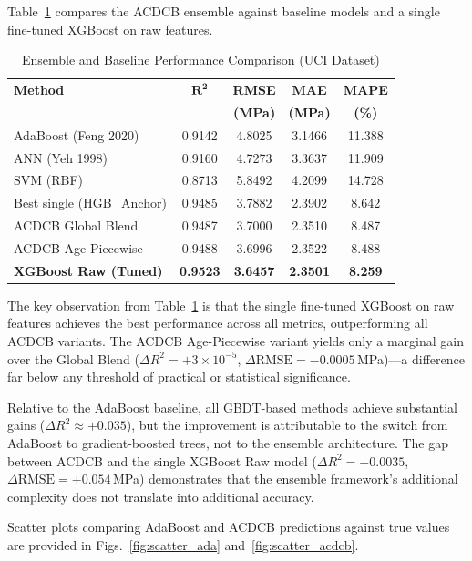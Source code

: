 \documentclass[journal]{IEEEtran}
\begin{document}
Table~\ref{tab:ensemble} compares the ACDCB ensemble against baseline models and a single fine-tuned XGBoost on raw features.

\begin{table}[!t]
\renewcommand{\arraystretch}{1.15}
\caption{Ensemble and Baseline Performance Comparison (UCI Dataset)}
\label{tab:ensemble}
\centering
\small
\begin{tabular}{p{2.1cm}cccc}
\toprule
\textbf{Method} & $\boldsymbol{R^2}$ & \textbf{RMSE} & \textbf{MAE} & \textbf{MAPE} \\
 & & \textbf{(MPa)} & \textbf{(MPa)} & \textbf{(\%)} \\
\midrule
AdaBoost (Feng 2020)    & 0.9142 & 4.8025 & 3.1466 & 11.388 \\
ANN (Yeh 1998)          & 0.9160 & 4.7273 & 3.3637 & 11.909 \\
SVM (RBF)               & 0.8713 & 5.8492 & 4.2099 & 14.728 \\
Best single (HGB\_Anchor) & 0.9485 & 3.7882 & 2.3902 & 8.642 \\
ACDCB Global Blend      & 0.9487 & 3.7000 & 2.3510 & 8.487 \\
ACDCB Age-Piecewise     & 0.9488 & 3.6996 & 2.3522 & 8.488 \\
\textbf{XGBoost Raw (Tuned)} & \textbf{0.9523} & \textbf{3.6457} & \textbf{2.3501} & \textbf{8.259} \\
\bottomrule
\end{tabular}
\end{table}

The key observation from Table~\ref{tab:ensemble} is that the single fine-tuned XGBoost on raw features achieves the best performance across all metrics, outperforming all ACDCB variants. The ACDCB Age-Piecewise variant yields only a marginal gain over the Global Blend ($\Delta R^2 = +3 \times 10^{-5}$, $\Delta\text{RMSE} = -0.0005$\,MPa)---a difference far below any threshold of practical or statistical significance.

Relative to the AdaBoost baseline, all GBDT-based methods achieve substantial gains ($\Delta R^2 \approx +0.035$), but the improvement is attributable to the switch from AdaBoost to gradient-boosted trees, not to the ensemble architecture. The gap between ACDCB and the single XGBoost Raw model ($\Delta R^2 = -0.0035$, $\Delta\text{RMSE} = +0.054$\,MPa) demonstrates that the ensemble framework's additional complexity does not translate into additional accuracy.

Scatter plots comparing AdaBoost and ACDCB predictions against true values are provided in Figs.~\ref{fig:scatter_ada} and~\ref{fig:scatter_acdcb}.
\end{document}
